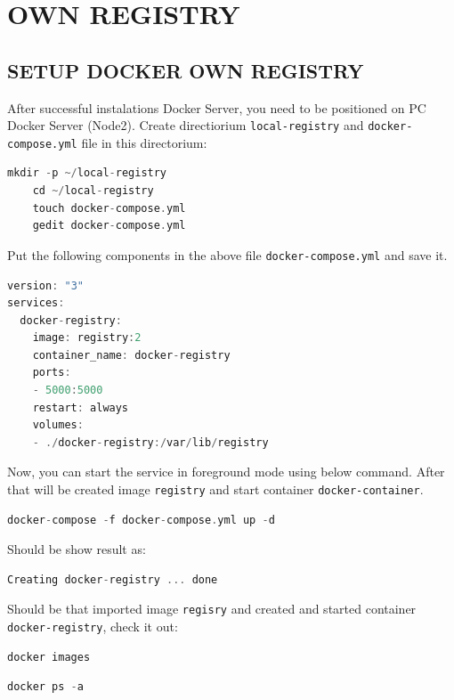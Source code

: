 \documentclass[12pt]{report}
\newcommand{\code}[1]{\texttt{#1}} %
\newcommand{\myred}[1]{{\color{my_red}#1}}
\begin{document}
\section{OWN REGISTRY}

\subsection{SETUP DOCKER OWN REGISTRY}
After successful instalations Docker Server, you need to be positioned on PC Docker Server (\myred{Node2}).
Create directiorium \code{local-registry} and \code{docker-compose.yml} file in this directorium:
\begin{lstlisting}[language=C, caption= Create dir local-registry and docker-compose.yml.]
	mkdir -p ~/local-registry
	cd ~/local-registry
	touch docker-compose.yml
	gedit docker-compose.yml
\end{lstlisting}

Put the following components in the above file \code {docker-compose.yml} and save it.
\begin{lstlisting}[language=C, caption= Content in docker-compose.yml.]
version: "3"
services:
  docker-registry:
    image: registry:2
    container_name: docker-registry
    ports:
    - 5000:5000
    restart: always
    volumes:
    - ./docker-registry:/var/lib/registry
\end{lstlisting}

Now, you can start the service in foreground mode using below command. After that will be created image \code{registry} and start container \code{docker-container}.
\begin{lstlisting}[language=C, caption= Start docker-compose.]
	docker-compose -f docker-compose.yml up -d
\end{lstlisting}

Should be show result as:
\begin{lstlisting}[language=C, caption= Result after docker-compose.]
	Creating docker-registry ... done
\end{lstlisting}

Should be that imported image \code{regisry} and created and started container \code{docker-registry}, check it out:
\begin{lstlisting}[language=C, caption= List of all images.]
	docker images
\end{lstlisting}
\begin{lstlisting}[language=C, caption= List of all containers.]
	docker ps -a
\end{lstlisting}
\end{document}
